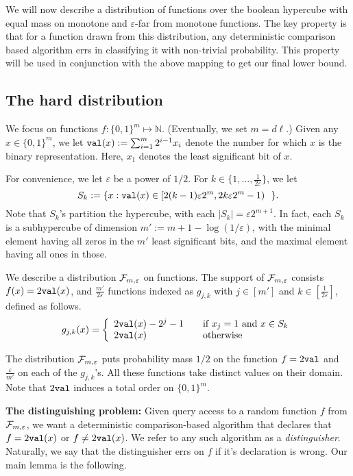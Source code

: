 \documentclass[11pt]{article}
\def\eps{\varepsilon}
\newcommand{\cF}{{\cal F}}
\newcommand{\NN}{\mathbb{N}}
\begin{document}
We will now describe a distribution of functions over the boolean hypercube with equal mass on monotone and $\eps$-far from monotone functions. The key property is that for a function drawn from this distribution, any deterministic comparison based algorithm errs in classifying it with non-trivial probability. 
This property will be used in conjunction with the above mapping to get our final lower bound.


\subsection{The hard distribution} \label{sec:hard}

We focus on functions $f:\{0,1\}^m \mapsto \NN$. (Eventually, we set $m = d\ell$.)
Given any $x \in \{0,1\}^m$, we let ${\tt val}(x) :=  \sum_{i = 1}^{m} 2^{i-1} x_i$ denote the number for which $x$ is the binary representation. Here, $x_1$ denotes the least significant bit of $x$. 

For convenience, we let $\eps$ be a power of $1/2$. For $k \in \{1,\ldots,\frac{1}{2\eps}\}$, we let  
$$S_k := \{x: \v(x) \in [2(k-1)\eps 2^m, 2k\eps 2^m-1)~~\}.$$
Note that $S_k$'s partition the hypercube, with each $|S_k| = \eps2^{m+1}$.
In fact, each $S_k$ is a subhypercube of dimension $m' := m+1-\log(1/\eps)$, with the minimal element having all zeros in the $m'$ least significant bits, and the maximal element having all ones in those.

We describe a distribution $\cF_{m,\eps}$ on functions. 
The support of $\cF_{m,\eps}$ consists $f(x) = 2{\tt val}(x)$,
and $\frac{m'}{2\eps}$ functions indexed as $g_{j,k}$ with $j\in [m']$ and $k\in[\frac{1}{2\eps}]$, defined as follows.
$$ g_{j,k}(x) = 
\left\{ 
\begin{array} {l l}
2{\tt val}(x) - 2^{j} - 1& \quad \textrm{if $x_j = 1$ and $x \in S_k$}\\
2{\tt val}(x) & \quad \textrm{otherwise} 
\end{array} \right.
$$

The distribution $\cF_{m,\eps}$ puts probability mass $1/2$ on the function $f=2{\tt val}$ and $\frac{\eps}{m'}$ on each of the $g_{j,k}$'s. 
All these functions take distinct values on their domain.
Note that $2{\tt val}$ induces a total order on $\{0,1\}^m$.\smallskip

\noindent
\textbf{The distinguishing problem:} Given query access to a random function $f$ from $\cF_{m,\eps}$, we want a deterministic comparison-based algorithm
that declares that $f = 2{\tt val}(x)$ or $f \neq 2{\tt val}(x)$. We refer to any such algorithm as a \emph{distinguisher}. 
Naturally, we say that the distinguisher errs on $f$ if it's declaration is wrong.
Our main lemma is the following.
\end{document}

